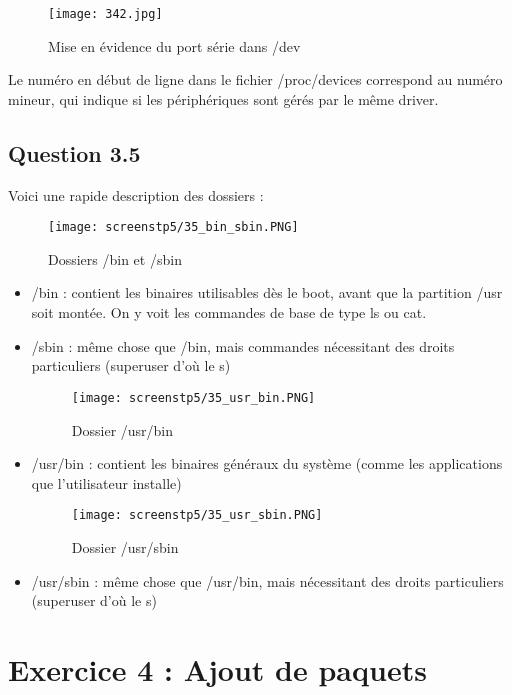 \documentclass[a4paper,12pt]{report}
\begin{document}
\begin{figure}[!]
\centering
\texttt{[image: 342.jpg]}
\caption{Mise en évidence du port série dans /dev}
\end{figure}

Le numéro en début de ligne dans le fichier /proc/devices correspond au numéro mineur, qui indique si les périphériques sont gérés par le même driver.

\newpage

\subsection{Question 3.5}

Voici une rapide description des dossiers :

\begin{figure}[h]
\centering
\texttt{[image: screenstp5/35\_bin\_sbin.PNG]}
\caption{Dossiers /bin et /sbin}
\end{figure}

\begin{itemize}
\item /bin : contient les binaires utilisables dès le boot, avant que la partition /usr soit montée. On y voit les commandes de base de type ls ou cat.
\item /sbin : même chose que /bin, mais commandes nécessitant des droits particuliers (superuser d'où le s)

\newpage
\begin{figure}[h]
\centering
\texttt{[image: screenstp5/35\_usr\_bin.PNG]}
\caption{Dossier /usr/bin}
\end{figure}

\item /usr/bin : contient les binaires généraux du système (comme les applications que l'utilisateur installe)

\begin{figure}[h]
\centering
\texttt{[image: screenstp5/35\_usr\_sbin.PNG]}
\caption{Dossier /usr/sbin}
\end{figure}

\item /usr/sbin : même chose que /usr/bin, mais nécessitant des droits particuliers (superuser d'où le s)
\end{itemize}


\newpage

\section{Exercice 4 : Ajout de paquets}
\end{document}

